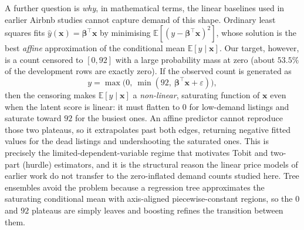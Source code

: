 \documentclass[11pt]{article}
\begin{document}
A further question is \emph{why}, in mathematical terms, the linear baselines used in earlier Airbnb studies cannot capture demand of this shape. Ordinary least squares fits $\hat y(\mathbf{x})=\boldsymbol{\beta}^{\top}\mathbf{x}$ by minimising $\mathbb{E}[(y-\boldsymbol{\beta}^{\top}\mathbf{x})^{2}]$, whose solution is the best \emph{affine} approximation of the conditional mean $\mathbb{E}[y\mid\mathbf{x}]$. Our target, however, is a count censored to $[0,92]$ with a large probability mass at zero (about $53.5\%$ of the development rows are exactly zero). If the observed count is generated as
\[ y=\max\!\big(0,\ \min(92,\ \boldsymbol{\beta}^{\top}\mathbf{x}+\varepsilon)\big), \]
then the censoring makes $\mathbb{E}[y\mid\mathbf{x}]$ a \emph{non-linear}, saturating function of $\mathbf{x}$ even when the latent score is linear: it must flatten to $0$ for low-demand listings and saturate toward $92$ for the busiest ones. An affine predictor cannot reproduce those two plateaus, so it extrapolates past both edges, returning negative fitted values for the dead listings and undershooting the saturated ones. This is precisely the limited-dependent-variable regime that motivates Tobit and two-part (hurdle) estimators, and it is the structural reason the linear price models of earlier work do not transfer to the zero-inflated demand counts studied here. Tree ensembles avoid the problem because a regression tree approximates the saturating conditional mean with axis-aligned piecewise-constant regions, so the $0$ and $92$ plateaus are simply leaves and boosting refines the transition between them.
\end{document}
